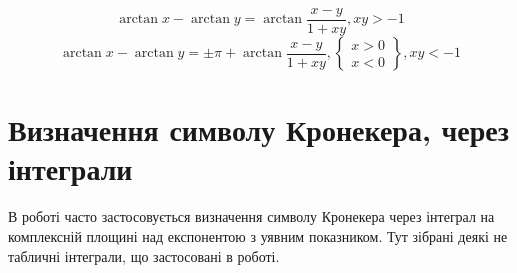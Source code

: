 %
\begin{equation}
\arctan x - \arctan y = 
\arctan \frac{x-y}{1+xy}, xy > -1 
\end{equation}
%
\begin{equation}
\arctan x - \arctan y = \pm \pi + \arctan \frac{x-y}{1+xy}, 
\left\{ \begin{array}{c} x > 0 \\ x < 0  \end{array} \right\}, xy < -1 
\end{equation}

\section{Визначення символу Кронекера, через інтеграли}

В роботі часто застосовується визначення символу Кронекера через 
інтеграл на комплексній площині над експонентою з уявним показником.
Тут зібрані деякі не табличні інтеграли, що застосовані в роботі. 

